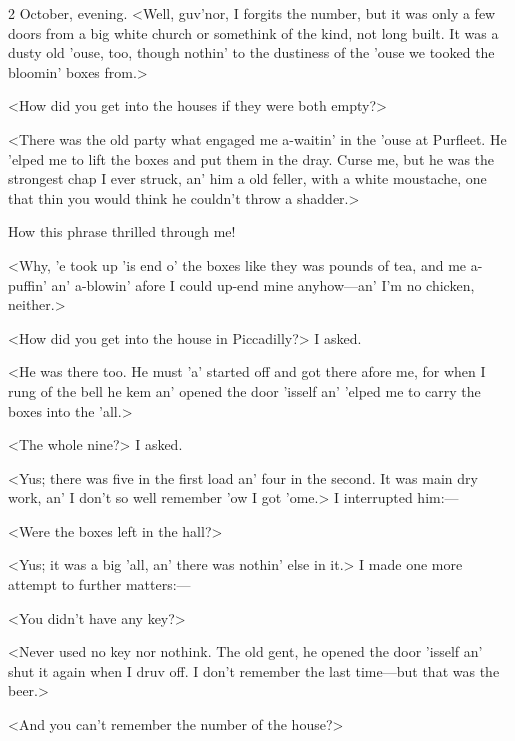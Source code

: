 \begin{diary}{2 October, evening.}
<Well, guv'nor, I forgits the number, but it was only a few doors from a big white church or somethink of the kind, not long built. It was a dusty old 'ouse, too, though nothin' to the dustiness of the 'ouse we tooked the bloomin' boxes from.>

<How did you get into the houses if they were both empty?>

<There was the old party what engaged me a-waitin' in the 'ouse at Purfleet. He 'elped me to lift the boxes and put them in the dray. Curse me, but he was the strongest chap I ever struck, an' him a old feller, with a white moustache, one that thin you would think he couldn't throw a shadder.>

How this phrase thrilled through me!

<Why, 'e took up 'is end o' the boxes like they was pounds of tea, and me a-puffin' an' a-blowin' afore I could up-end mine anyhow—an' I'm no chicken, neither.>

<How did you get into the house in Piccadilly?> I asked.

<He was there too. He must 'a' started off and got there afore me, for when I rung of the bell he kem an' opened the door 'isself an' 'elped me to carry the boxes into the 'all.>

<The whole nine?> I asked.

<Yus; there was five in the first load an' four in the second. It was main dry work, an' I don't so well remember 'ow I got 'ome.> I interrupted him:—

<Were the boxes left in the hall?>

<Yus; it was a big 'all, an' there was nothin' else in it.> I made one more attempt to further matters:—

<You didn't have any key?>

<Never used no key nor nothink. The old gent, he opened the door 'isself an' shut it again when I druv off. I don't remember the last time—but that was the beer.>

<And you can't remember the number of the house?>


\end{diary}
